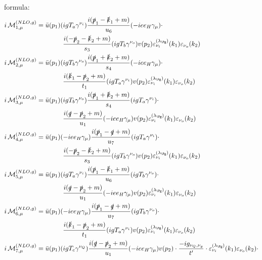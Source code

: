 formula:
\begin{align}
i\Md^{(NLO,g)}_{1,\mu} &= \bar u(p_1)(igT_a\gamma^{\nu_i})\frac{i(\slashed{p}_1-\slashed{k}_1+m)}{u_6}(-i e e_H \gamma_\mu)\cdot\nonumber\\
 &\hspace{40pt}\frac{i(-\slashed{p}_2-\slashed{k}_2+m)}{s_3}(igT_b\gamma^{\nu_o})v(p_2)\varepsilon^{(\lambda_{\Pg})}_{\nu_i}(k_1)\varepsilon_{\nu_o}(k_2)\\
i\Md^{(NLO,g)}_{2,\mu} &= \bar u(p_1)(igT_b\gamma^{\nu_o})\frac{i(\slashed{p}_1+\slashed{k}_2+m)}{s_4}(-i e e_H \gamma_\mu)\cdot\nonumber\\
 &\hspace{40pt}\frac{i(\slashed{k}_1-\slashed{p}_2+m)}{t_1}(igT_a\gamma^{\nu_i})v(p_2)\varepsilon^{(\lambda_{\Pg})}_{\nu_i}(k_1)\varepsilon_{\nu_o}(k_2)\\
i\Md^{(NLO,g)}_{3,\mu} &= \bar u(p_1)(igT_b\gamma^{\nu_o})\frac{i(\slashed{p}_1+\slashed{k}_2+m)}{s_4}(igT_a\gamma^{\nu_i})\cdot\nonumber\\
 &\hspace{40pt}\frac{i(\slashed{q}-\slashed{p}_2+m)}{u_1}(-i e e_H \gamma_\mu)v(p_2)\varepsilon^{(\lambda_{\Pg})}_{\nu_i}(k_1)\varepsilon_{\nu_o}(k_2)\\
i\Md^{(NLO,g)}_{4,\mu} &= \bar u(p_1)(-i e e_H \gamma_\mu)\frac{i(\slashed{p}_1-\slashed{q}+m)}{u_7}(igT_a\gamma^{\nu_i})\cdot\nonumber\\
 &\hspace{40pt}\frac{i(-\slashed{p}_2-\slashed{k}_2+m)}{s_3}(igT_b\gamma^{\nu_o})v(p_2)\varepsilon^{(\lambda_{\Pg})}_{\nu_i}(k_1)\varepsilon_{\nu_o}(k_2)\\
i\Md^{(NLO,g)}_{5,\mu} &= \bar u(p_1)(igT_a\gamma^{\nu_i})\frac{i(\slashed{p}_1-\slashed{k}_1+m)}{u_6}(igT_b\gamma^{\nu_o})\cdot\nonumber\\
 &\hspace{40pt}\frac{i(\slashed{q}-\slashed{p}_2+m)}{u_1}(-i e e_H \gamma_\mu)v(p_2)\varepsilon^{(\lambda_{\Pg})}_{\nu_i}(k_1)\varepsilon_{\nu_o}(k_2)\\
i\Md^{(NLO,g)}_{6,\mu} &= \bar u(p_1)(-i e e_H \gamma_\mu)\frac{i(\slashed{p}_1-\slashed{q}+m)}{u_7}(igT_b\gamma^{\nu_o})\cdot\nonumber\\
 &\hspace{40pt}\frac{i(\slashed{k}_1-\slashed{p}_2+m)}{t_1}(igT_a\gamma^{\nu_i})v(p_2)\varepsilon^{(\lambda_{\Pg})}_{\nu_i}(k_1)\varepsilon_{\nu_o}(k_2)\\
i\Md^{(NLO,g)}_{7,\mu} &= \bar u(p_1)(igT_c\gamma^{\nu_Q})\frac{i(\slashed{q}-\slashed{p}_2+m)}{u_1}(-i e e_H \gamma_\mu)v(p_2)\cdot\frac{-ig_{\nu_Q,\nu_g}}{t'}\cdot\varepsilon^{(\lambda_{\Pg})}_{\nu_i}(k_1)\varepsilon_{\nu_o}(k_2)\cdot\nonumber\\

\end{align}
